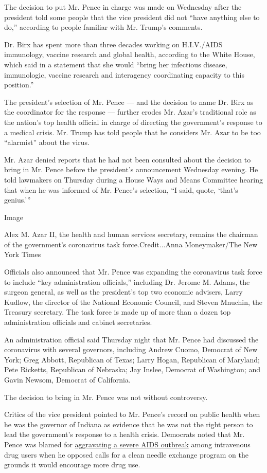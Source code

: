 The decision to put Mr. Pence in charge was made on Wednesday after the
president told some people that the vice president did not ``have
anything else to do,'' according to people familiar with Mr. Trump's
comments.

Dr. Birx has spent more than three decades working on H.I.V./AIDS
immunology, vaccine research and global health, according to the White
House, which said in a statement that she would ``bring her infectious
disease, immunologic, vaccine research and interagency coordinating
capacity to this position.''

The president's selection of Mr. Pence --- and the decision to name Dr.
Birx as the coordinator for the response --- further erodes Mr. Azar's
traditional role as the nation's top health official in charge of
directing the government's response to a medical crisis. Mr. Trump has
told people that he considers Mr. Azar to be too ``alarmist'' about the
virus.

Mr. Azar denied reports that he had not been consulted about the
decision to bring in Mr. Pence before the president's announcement
Wednesday evening. He told lawmakers on Thursday during a House Ways and
Means Committee hearing that when he was informed of Mr. Pence's
selection, ``I said, quote, `that's genius.'''

Image

Alex M. Azar II, the health and human services secretary, remains the
chairman of the government's coronavirus task force.Credit...Anna
Moneymaker/The New York Times

Officials also announced that Mr. Pence was expanding the coronavirus
task force to include ``key administration officials,'' including Dr.
Jerome M. Adams, the surgeon general, as well as the president's top two
economic advisers, Larry Kudlow, the director of the National Economic
Council, and Steven Mnuchin, the Treasury secretary. The task force is
made up of more than a dozen top administration officials and cabinet
secretaries.

An administration official said Thursday night that Mr. Pence had
discussed the coronavirus with several governors, including Andrew
Cuomo, Democrat of New York; Greg Abbott, Republican of Texas; Larry
Hogan, Republican of Maryland; Pete Ricketts, Republican of Nebraska;
Jay Inslee, Democrat of Washington; and Gavin Newsom, Democrat of
California.

The decision to bring in Mr. Pence was not without controversy.

Critics of the vice president pointed to Mr. Pence's record on public
health when he was the governor of Indiana as evidence that he was not
the right person to lead the government's response to a health crisis.
Democrats noted that Mr. Pence was blamed for
\href{https://www.nytimes3xbfgragh.onion/2015/05/06/us/rural-indiana-struggles-to-contend-with-hiv-outbreak.html}{aggravating
a severe AIDS outbreak} among intravenous drug users when he opposed
calls for a clean needle exchange program on the grounds it would
encourage more drug use.

